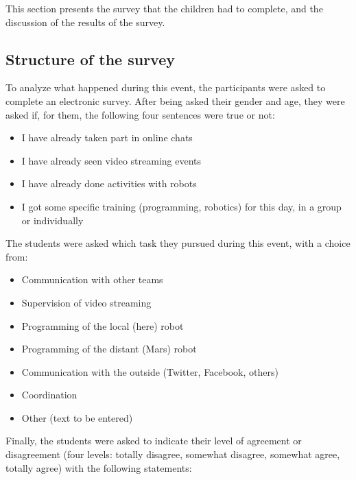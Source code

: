 \documentclass{intech-journal}
\begin{document}
This section presents the survey that the children had to complete, and the discussion of the results of the survey. 

\subsection{Structure of the survey}

To analyze what happened during this event, the participants were asked to complete an electronic survey.
After being asked their gender and age, they were asked if, for them, the following four sentences were true or not:
\begin{itemize}
\item I have already taken part in online chats 	
\item I have already seen video streaming events 	
\item I have already done activities with robots 
\item I got some specific training (programming, robotics) for this day, in a group or individually
\end{itemize}
The students were asked which task they pursued during this event, with a choice from:
\begin{itemize}
\item Communication with other teams
\item Supervision of video streaming
\item Programming of the local (here) robot
\item Programming of the distant (Mars) robot
\item Communication with the outside (Twitter, Facebook, others)
\item Coordination
\item Other (text to be entered)
\end{itemize}
Finally, the students were asked to indicate their level of agreement or disagreement (four levels: totally disagree, somewhat disagree, somewhat agree, totally agree) with the following statements:
\end{document}
